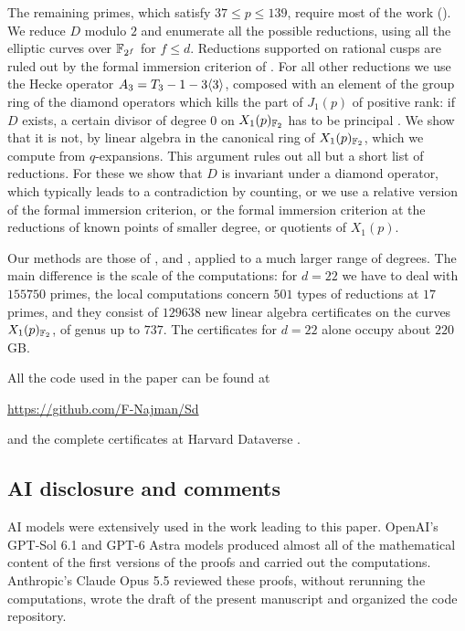 The remaining primes, which satisfy $37\leq p\leq 139$, require most of the work (). We reduce $D$ modulo $2$ and enumerate all the possible reductions, using all the elliptic curves over $\mathbb{F}_{2^f}$ for $f\leq d$. Reductions supported on rational cusps are ruled out by the formal immersion criterion of \cite{DKSS}. For all other reductions we use the Hecke operator $A_3=T_3-1-3\langle 3\rangle$, composed with an element of the group ring of the diamond operators which kills the part of $J_1(p)$ of positive rank: if $D$ exists, a certain divisor of degree $0$ on $X_1(p)_{\mathbb{F}_2}$ has to be principal \cite[Lemma 8.6]{DKSS}. We show that it is not, by linear algebra in the canonical ring of $X_1(p)_{\mathbb{F}_2}$, which we compute from $q$-expansions. This argument rules out all but a short list of reductions. For these we show that $D$ is invariant under a diamond operator, which typically leads to a contradiction by counting, or we use a relative version of the formal immersion criterion, or the formal immersion criterion at the reductions of known points of smaller degree, or quotients of $X_1(p)$.

Our methods are those of \cite{DKSS}, \cite{DSt} and \cite{khawaja}, applied to a much larger range of degrees. The main difference is the scale of the computations: for $d=22$ we have to deal with $155750$ primes, the local computations concern $501$ types of reductions at $17$ primes, and they consist of $129638$ new linear algebra certificates on the curves $X_1(p)_{\mathbb{F}_2}$, of genus up to $737$. The certificates for $d=22$ alone occupy about $220$ GB.

All the code used in the paper can be found at
\begin{center}
\url{https://github.com/F-Najman/Sd}
\end{center}
and the complete certificates at Harvard Dataverse \cite{Ndata}.

\subsection*{AI disclosure and comments}
AI models were extensively used in the work leading to this paper. OpenAI's GPT-Sol 6.1 and GPT-6 Astra models produced almost all of the mathematical content of the first versions of the proofs and carried out the computations. Anthropic's Claude Opus 5.5 reviewed these proofs, without rerunning the computations, wrote the draft of the present manuscript and organized the code repository.

